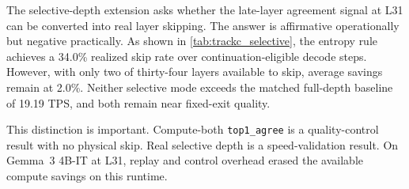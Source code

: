 \documentclass[11pt]{article}
\begin{document}
\begin{table}[t]
\centering
\small
\caption{Selective-depth benchmark at L31 on the shared expository subset ($P2$--$P5$ scored after warmup). All numbers should be compared to the full-depth row within this table, as they come from a dedicated selective-depth runtime.}
\label{tab:trackc_selective}
\end{table}

The selective-depth extension asks whether the late-layer agreement signal at L31 can be converted into real layer skipping. The answer is affirmative operationally but negative practically. As shown in \cref{tab:trackc_selective}, the entropy rule achieves a 34.0\% realized skip rate over continuation-eligible decode steps. However, with only two of thirty-four layers available to skip, average savings remain at 2.0\%. Neither selective mode exceeds the matched full-depth baseline of 19.19 TPS, and both remain near fixed-exit quality.

This distinction is important. Compute-both \texttt{top1\_agree} is a quality-control result with no physical skip. Real selective depth is a speed-validation result. On Gemma~3 4B-IT at L31, replay and control overhead erased the available compute savings on this runtime.
\end{document}
